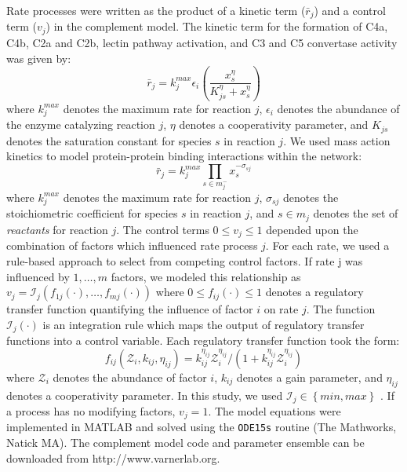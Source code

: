 \documentclass[12pt]{article}
\begin{document}
Rate processes were written as the product of a kinetic term ($\bar{r}_{j}$) and a control term ($v_{j}$) in the complement model.
The kinetic term for the formation of C4a, C4b, C2a and C2b, lectin pathway activation, and C3 and C5 convertase activity was given by:
\begin{equation}\label{eqn:rate-saturation}
	\bar{r}_{j} = k_{j}^{max}\epsilon_{i}\left(\frac{x_{s}^{\eta}}{K_{js}^{\eta} + x_{s}^{\eta}}\right)
\end{equation}
where $k_{j}^{max}$ denotes the maximum rate for reaction $j$, $\epsilon_{i}$ denotes the abundance of the enzyme catalyzing reaction $j$,
$\eta$ denotes a cooperativity parameter, and $K_{js}$ denotes the saturation constant for species $s$ in reaction $j$.
We used mass action kinetics to model protein-protein binding interactions within the network:
\begin{equation}\label{eqn:rate-action}
	\bar{r}_{j} = k_{j}^{max}\prod_{s\in{m_{j}^{-}}}x_{s}^{-\sigma_{sj}}
\end{equation}
where $k_{j}^{max}$ denotes the maximum rate for reaction $j$, $\sigma_{sj}$ denotes the stoichiometric coefficient for species $s$ in reaction $j$,
and $s\in{m_{j}}$ denotes the set of \textit{reactants} for reaction $j$.
The control terms $0\leq v_{j}\leq 1$ depended upon the combination of factors which influenced rate process $j$.
For each rate, we used a rule-based approach to select from competing control factors.
If rate j was influenced by $1,\dots,m$ factors, we modeled this relationship as
$v_{j}=\mathcal{I}_{j}\left(f_{1j}\left(\cdot\right),\hdots,f_{mj}\left(\cdot\right)\right)$
where $0\leq f_{ij}\left(\cdot\right)\leq 1$ denotes a regulatory transfer function quantifying the influence of factor $i$ on rate $j$.
The function $\mathcal{I}_{j}\left(\cdot\right)$ is an integration rule which maps the output of regulatory transfer functions into a control
variable. Each regulatory transfer function took the form:
\begin{equation}\label{eqn:control-factor}
	f_{ij}\left(\mathcal{Z}_{i},k_{ij},\eta_{ij}\right)=k_{ij}^{\eta_{ij}}\mathcal{Z}_{i}^{\eta_{ij}}/\left({1 + k_{ij}^{\eta_{ij}}\mathcal{Z}_{i}^{\eta_{ij}}}\right)
\end{equation}where $\mathcal{Z}_{i}$ denotes the abundance of factor $i$, $k_{ij}$ denotes a gain parameter, and $\eta_{ij}$ denotes a cooperativity parameter.
In this study, we used $\mathcal{I}_{j}\in\left\{min,max\right\}$ \cite{pr3010178}. If a process has no modifying factors, $v_{j}=1$.
The model equations were implemented in MATLAB and solved using the \texttt{ODE15s} routine (The Mathworks, Natick MA).
The complement model code and parameter ensemble can be downloaded from http://www.varnerlab.org.
\end{document}
